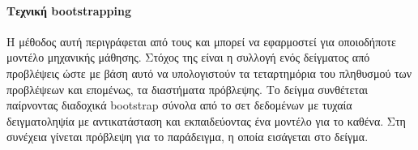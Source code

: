 \paragraph{Τεχνική bootstrapping}
Η μέθοδος αυτή περιγράφεται από τους \citet{Davison:2013:BMA:2556084} και μπορεί να εφαρμοστεί για οποιοδήποτε μοντέλο μηχανικής μάθησης. Στόχος της είναι η συλλογή ενός δείγματος από προβλέψεις ώστε με βάση αυτό να υπολογιστούν τα τεταρτημόρια του πληθυσμού των προβλέψεων και επομένως, τα διαστήματα πρόβλεψης. Το δείγμα συνθέτεται παίρνοντας διαδοχικά bootstrap σύνολα από το σετ δεδομένων με τυχαία δειγματοληψία με αντικατάσταση και εκπαιδεύοντας ένα μοντέλο για το καθένα. Στη συνέχεια γίνεται πρόβλεψη για το παράδειγμα, η οποία εισάγεται στο δείγμα.
